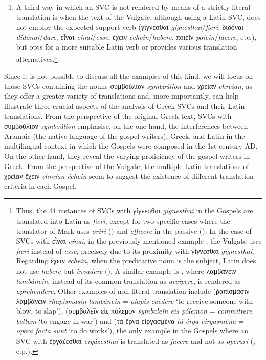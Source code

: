 \documentclass[output=paper,colorlinks,citecolor=brown]{langscibook}
\begin{document}
\begin{enumerate}
\item A third way in which an SVC is not rendered by means of a strictly literal
  translation is when the text of the Vulgate, although using a Latin SVC, does not employ
  the expected support verb (γίγνεσθαι \emph{gígnesthai}/\emph{fieri}, διδόναι
  \emph{didónai}/\emph{dare}, εἶναι \emph{eînai}/\emph{esse}, ἔχειν
  \emph{échein}/\emph{habere}, ποιεῖν \emph{poi\-eîn}/\emph{facere}, etc.), but opts for
  a more suitable Latin verb or provides various translation alternatives.\footnote{Thus, the 44
    instances of SVCs with γίγνεσθαι \emph{gígnesthai} in the Gospels are translated
    into Latin as \emph{fieri}, except for two specific cases where the translator of Mark
    uses \emph{oriri} () and \emph{efficere} in the passive (). In the case
    of SVCs with εἶναι \emph{eînai}, in the previously mentioned example , the Vulgate
    uses \emph{fieri} instead of \emph{esse}, precisely due to its proximity with
    γίγνεσθαι \emph{gígnesthai}. Regarding ἔχειν \emph{échein}, when the predicative noun is the
    subject, Latin does not use \emph{habere} but \emph{invadere} (). A similar
    example is , where λαμβάνειν \textit{lambánein}, instead of its common translation as
    \emph{accipere}, is rendered as \emph{aprehendere}. Other examples of non-literal
    translation include  (ῥαπίσμασιν λαμβάνειν \emph{rhapísmasin lambánein} =
    \emph{alapis caedere} `to receive someone with blow, to slap'),  (συμβαλεῖν εἰς
    πόλεμον \emph{symbaleîn eis pólemon} = \emph{committere bellum} `to engage in war')
    and  (τὰ ἔργα εἰργασμένα \emph{tà érga eirgasména} = \emph{opera facta sunt}
    `to do works'), the only example in the Gospels where an SVC with ἐργάζεσθαι
    \emph{ergázesthai} is translated as \emph{facere} and not as \emph{operari}
    (\cite{BañosJoséMiguelJiménezLópezM.Dolores-2022707}, e.p.).}

\end{enumerate}



Since it is not possible to discuss all the examples of this kind, we will focus on those
  SVCs containing the nouns συμβούλιον \emph{symboúlion} and χρείαν \emph{chreían}, as
  they offer a greater variety of translations and, more importantly, can help illustrate
  three crucial aspects of the analysis of Greek SVCs and their Latin translations. From
  the perspective of the original Greek text, SVCs with συμβούλιον \emph{symboúlion} emphasise, on the one
  hand, the interferences between Aramaic (the native language of the gospel writers),
  Greek, and Latin in the multilingual context in which the Gospels were composed in the
  1st century AD. On the other hand, they reveal the varying proficiency of the gospel
  writers in Greek. From the perspective of the Vulgate, the multiple Latin translations
  of χρείαν ἔχειν \emph{chreían échein} seem to suggest the existence of different
  translation criteria in each Gospel.
\end{document}
